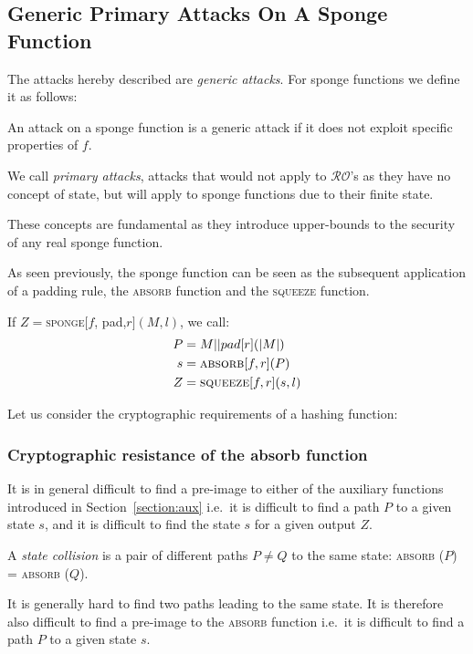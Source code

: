 \subsection{Generic Primary Attacks On A Sponge Function}

The attacks hereby described are \emph{generic attacks}. For sponge functions we define it as follows: 

\begin{defn}
An attack on a sponge function is a generic attack if it does not exploit specific properties of $f$.
\end{defn}

We call \emph{primary attacks}, attacks that would not apply to $\mathcal{RO}$'s as they have no concept of state, but will apply to sponge functions due to their finite state.

These concepts are fundamental as they introduce upper-bounds to the security of any real sponge function.

As seen previously, the sponge function can be seen as the subsequent application of a padding rule, the \textsc{absorb} function and the \textsc{squeeze} function.

\begin{nota}
If $Z=$\textsc{sponge}$\lbrack f$, pad,$r\rbrack(M,l)$, we call:
\begin{equation}
\begin{aligned}
P & = M\vert \vert pad \lbrack r \rbrack (\vert M \vert )  \\
s & = \mbox{\textsc{absorb}} \lbrack f,r \rbrack (P) \\
Z & = \mbox{\textsc{squeeze}} \lbrack f,r \rbrack (s,l) \\
\end{aligned}
\end{equation}
\end{nota}
Let us consider the cryptographic requirements of a hashing function:
\subsubsection{Cryptographic resistance of the absorb function}
It is in general difficult to find a pre-image to either of the auxiliary functions introduced in Section~\ref{section:aux} i.e.\ it is difficult to find a path $P$ to a given state $s$, and it is difficult to find the state $s$ for a given output $Z$.

\begin{defn}
A \emph{state collision} is a pair of different paths $P \ne Q$ to the same state: \textsc{absorb} ($P$) = \textsc{absorb} ($Q$).
\end{defn}
It is generally hard to find two paths leading to the same state. It is therefore also difficult to find a pre-image to the \textsc{absorb} function i.e.\ it is difficult to find a path $P$ to a given state $s$.

